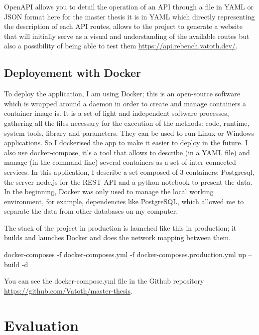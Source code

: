 \documentclass{article}
\begin{document}
OpenAPI allows you to detail the operation of an API through a file in YAML or JSON format here for the master thesis it is in YAML which directly representing the description of each API routes, allows to the project to generate a website that will initially serve as a visual and understanding of the available routes but also a possibility of being able to test them \url{https://api.rebench.vatoth.dev/}.



\subsection{Deployement with Docker}

To deploy the application, I am using Docker; this is an open-source software which is wrapped around a daemon in order to create and manage containers a container image is. It is a set of light and independent software processes, gathering all the files necessary for the execution of the methods: code, runtime, system tools, library and parameters. They can be used to run Linux or Windows applications. So I dockerised the app to make it easier to deploy in the future. I also use docker-compose, it's a tool that allows to describe (in a YAML file) and manage (in the command line) several containers as a set of inter-connected services. In this application, I describe a set composed of 3 containers: Postgresql, the server node.js for the REST API and a python notebook to present the data. In the beginning, Docker was only used to manage the local working environment, for example, dependencies like PostgreSQL, which allowed me to separate the data from other databases on my computer.

The stack of the project in production is launched like this in production; it builds and launches Docker and does the network mapping between them.

docker-composes -f docker-composes.yml -f docker-composes.production.yml up --build -d

You can see the docker-compose.yml file in the Github repository \url{https://github.com/Vatoth/master-thesis}. 

\section{Evaluation}
\end{document}
